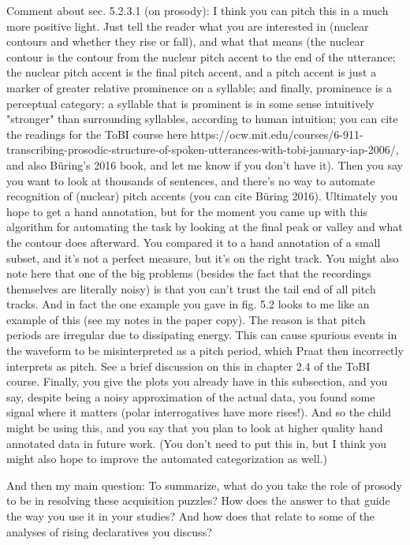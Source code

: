 {%
Comment about sec. 5.2.3.1 (on prosody): I think you can pitch this in a much more positive light. Just tell the reader what you are interested in (nuclear contours and whether they rise or fall), and what that means (the nuclear contour is the contour from the nuclear pitch accent to the end of the utterance; the nuclear pitch accent is the final pitch accent, and a pitch accent is just a marker of greater relative prominence on a syllable; and finally, prominence is a perceptual category: a syllable that is prominent is in some sense intuitively "stronger" than surrounding syllables, according to human intuition; you can cite the readings for the ToBI course here https://ocw.mit.edu/courses/6-911-transcribing-prosodic-structure-of-spoken-utterances-with-tobi-january-iap-2006/, and also Büring's 2016 book, and let me know if you don't have it). Then you say you want to look at thousands of sentences, and there's no way to automate recognition of (nuclear) pitch accents (you can cite Büring 2016). Ultimately you hope to get a hand annotation, but for the moment you came up with this algorithm for automating the task by looking at the final peak or valley and what the contour does afterward. You compared it to a hand annotation of a small subset, and it's not a perfect measure, but it's on the right track. You might also note here that one of the big problems (besides the fact that the recordings themselves are literally noisy) is that you can't trust the tail end of all pitch tracks. And in fact the one example you gave in fig. 5.2 looks to me like an example of this (see my notes in the paper copy). The reason is that pitch periods are irregular due to dissipating energy. This can cause spurious events in the waveform to be misinterpreted as a pitch period, which Praat then incorrectly interprets as pitch. See a brief discussion on this in chapter 2.4 of the ToBI course. Finally, you give the plots you already have in this subsection, and you say, despite being a noisy approximation of the actual data, you found some signal where it matters (polar interrogatives have more rises!). And so the child might be using this, and you say that you plan to look at higher quality hand annotated data in future work. (You don't need to put this in, but I think you might also hope to improve the automated categorization as well.)

And then my main question: To summarize, what do you take the role of prosody to be in resolving these acquisition puzzles? How does the answer to that guide the way you use it in your studies? And how does that relate to some of the analyses of rising declaratives you discuss? 



}
